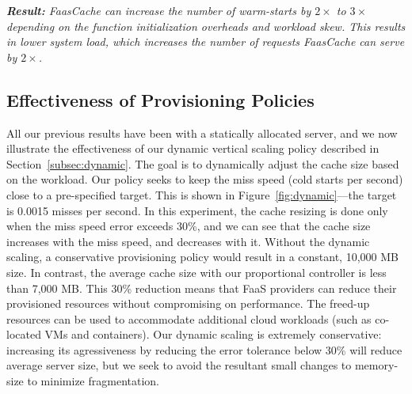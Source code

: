 \noindent \emph{\textbf{Result:} FaasCache can increase the number of warm-starts by $2\times$ to $3\times$ depending on the function initialization overheads and workload skew. This results in lower system load, which increases the number of requests FaasCache can serve by $2\times$.}


\subsection{Effectiveness of Provisioning Policies}
\vspace*{\subsecspace}
All our previous results have been with a statically allocated server, and 
we now illustrate the effectiveness of our dynamic vertical scaling policy described in Section~\ref{subsec:dynamic}.
The goal is to dynamically adjust the cache size based on the workload. 
Our  policy seeks to keep the miss speed (cold starts per second) close to a pre-specified target. 
This is shown in Figure~\ref{fig:dynamic}---the target is 0.0015 misses per second. 
In this experiment, the cache resizing is done only when the miss speed error exceeds 30\%, and we can see that the cache size increases with the miss speed, and decreases with it. 
Without the dynamic scaling, a conservative provisioning policy would result in a constant, 10,000 MB size. 
In contrast, the average cache size with our proportional controller is less than 7,000 MB.
This 30\% reduction means that FaaS providers can reduce their provisioned resources without compromising on performance.
The freed-up resources can be used to accommodate additional cloud workloads (such as co-located VMs and containers). 
Our dynamic scaling is extremely conservative: increasing its agressiveness by reducing the error tolerance below 30\% will reduce  average server size,
but we seek to avoid the resultant small changes to memory-size to minimize fragmentation. 

